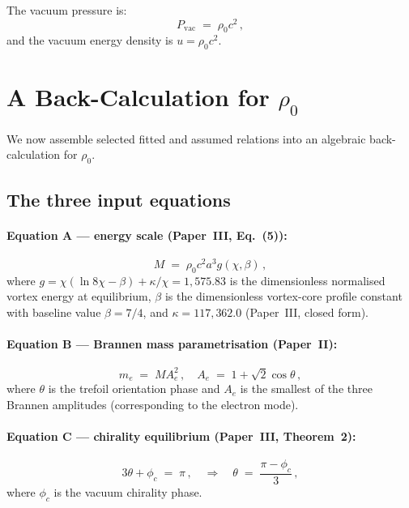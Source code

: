 \documentclass[11pt]{article}
\begin{document}
The vacuum pressure is:
\begin{equation}
  P_\text{vac} \;=\; \rho_0 c^2\,,
  \label{eq:vacuum_pressure}
\end{equation}
and the vacuum energy density is $u = \rho_0 c^2$.


\section{A Back-Calculation for $\rho_0$}
\label{sec:master}

We now assemble selected fitted and assumed relations into an algebraic
back-calculation for $\rho_0$.

\subsection{The three input equations}

\paragraph{Equation A --- energy scale (Paper~III, Eq.~(5)):}
\begin{equation}
  M \;=\; \rho_0 c^2 a^3 g(\chi, \beta)\,,
  \label{eq:A}
\end{equation}
where $g = \chi(\ln 8\chi - \beta) + \kappa/\chi = 1{,}575.83$ is the
dimensionless normalised vortex energy at equilibrium, $\beta$ is the
dimensionless vortex-core profile constant with baseline value $\beta=7/4$, and
$\kappa = 117{,}362.0$ (Paper~III, closed form).

\paragraph{Equation B --- Brannen mass parametrisation (Paper~II):}
\begin{equation}
  m_e \;=\; M A_e^2\,,
  \quad A_e \;=\; 1 + \sqrt{2}\cos\theta\,,
  \label{eq:B}
\end{equation}
where $\theta$ is the trefoil orientation phase and $A_e$ is the smallest
of the three Brannen amplitudes (corresponding to the electron mode).

\paragraph{Equation C --- chirality equilibrium (Paper~III, Theorem~2):}
\begin{equation}
  3\theta + \phi_c \;=\; \pi\,,
  \quad\Rightarrow\quad
  \theta \;=\; \frac{\pi - \phi_c}{3}\,,
  \label{eq:C}
\end{equation}
where $\phi_c$ is the vacuum chirality phase.
\end{document}
